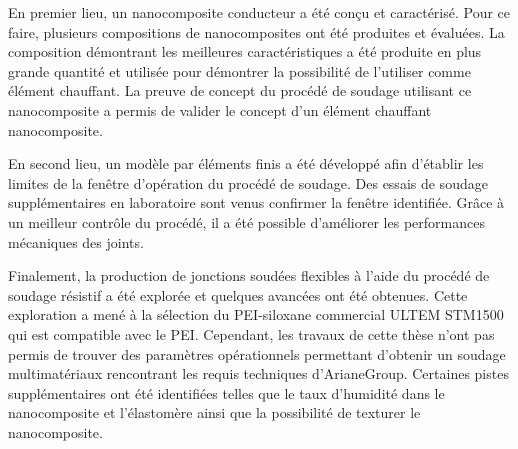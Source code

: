 %

En premier lieu, un nanocomposite conducteur a été conçu et caractérisé. 
Pour ce faire, plusieurs compositions de nanocomposites ont été produites et évaluées. 
La composition démontrant les meilleures caractéristiques a été produite en plus grande quantité et utilisée pour démontrer la possibilité de l'utiliser comme élément chauffant. 
La preuve de concept du procédé de soudage utilisant ce nanocomposite a permis de valider le concept d'un élément chauffant nanocomposite. 

En second lieu, un modèle par éléments finis a été développé afin d'établir les limites de la fenêtre d'opération du procédé de soudage. 
Des essais de soudage supplémentaires en laboratoire sont venus confirmer la fenêtre identifiée. 
Grâce à un meilleur contrôle du procédé, il a été possible d'améliorer les performances mécaniques des joints. 

Finalement, la production de jonctions soudées flexibles à l'aide du procédé de soudage résistif a été explorée et quelques avancées ont été obtenues. 
Cette exploration a mené à la sélection du PEI-siloxane commercial ULTEM STM1500 qui est compatible avec le PEI. 
Cependant, les travaux de cette thèse n'ont pas permis de trouver des paramètres opérationnels permettant d'obtenir un soudage multimatériaux rencontrant les requis techniques d'ArianeGroup. 
Certaines pistes supplémentaires ont été identifiées telles que le taux d'humidité dans le nanocomposite et l'élastomère ainsi que la possibilité de texturer le nanocomposite. 

